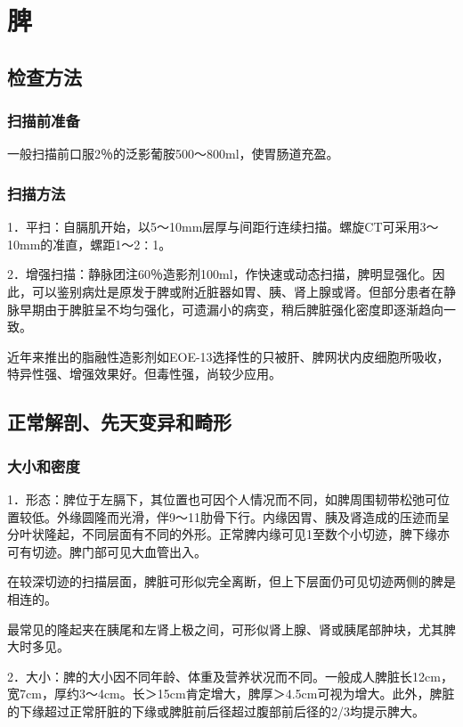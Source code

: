 \chapter{脾}

\section{检查方法}

\subsection{扫描前准备}

一般扫描前口服2％的泛影葡胺500～800ml，使胃肠道充盈。

\subsection{扫描方法}

1．平扫：自膈肌开始，以5～10mm层厚与间距行连续扫描。螺旋CT可采用3～10mm的准直，螺距1～2∶1。

2．增强扫描：静脉团注60％造影剂100ml，作快速或动态扫描，脾明显强化。因此，可以鉴别病灶是原发于脾或附近脏器如胃、胰、肾上腺或肾。但部分患者在静脉早期由于脾脏呈不均匀强化，可遗漏小的病变，稍后脾脏强化密度即逐渐趋向一致。

近年来推出的脂融性造影剂如EOE-13选择性的只被肝、脾网状内皮细胞所吸收，特异性强、增强效果好。但毒性强，尚较少应用。

\section{正常解剖、先天变异和畸形}

\subsection{大小和密度}

1．形态：脾位于左膈下，其位置也可因个人情况而不同，如脾周围韧带松弛可位置较低。外缘圆隆而光滑，伴9～11肋骨下行。内缘因胃、胰及肾造成的压迹而呈分叶状隆起，不同层面有不同的外形。正常脾内缘可见1至数个小切迹，脾下缘亦可有切迹。脾门部可见大血管出入。

在较深切迹的扫描层面，脾脏可形似完全离断，但上下层面仍可见切迹两侧的脾是相连的。

最常见的隆起夹在胰尾和左肾上极之间，可形似肾上腺、肾或胰尾部肿块，尤其脾大时多见。

2．大小：脾的大小因不同年龄、体重及营养状况而不同。一般成人脾脏长12cm，宽7cm，厚约3～4cm。长＞15cm肯定增大，脾厚＞4.5cm可视为增大。此外，脾脏的下缘超过正常肝脏的下缘或脾脏前后径超过腹部前后径的2/3均提示脾大。

